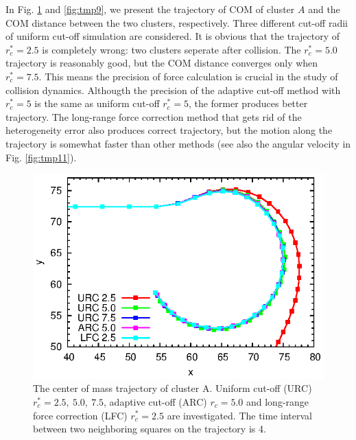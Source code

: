 \documentclass[aps,pre,preprint]{revtex4-1}
\begin{document}
In Fig. \ref{fig:tmp8} and \ref{fig:tmp9}, we present the trajectory
of COM of cluster $A$ and the COM distance between the two clusters,
respectively. Three different cut-off radii of uniform cut-off
simulation are considered. It is obvious that the trajectory of
$r_c^\ast = 2.5$ is completely wrong: two clusters seperate after
collision. The $r_c^\ast = 5.0$ trajectory is reasonably good, but the
COM distance converges only when $r_c^\ast = 7.5$. This means the
precision of force calculation is crucial in the study of collision
dynamics. Althougth the precision of the adaptive cut-off method with
$r_c^\ast = 5$ is the same as uniform cut-off $r_c^\ast = 5$, the former
produces better trajectory. The long-range force
correction method that gets rid of the heterogeneity error also produces
correct trajectory, but the motion along the trajectory is somewhat
faster than other methods (see also the angular velocity in
Fig. \ref{fig:tmp11}).

\begin{figure}
  \centering
  \includegraphics[]{fig/trajs.eps}
  \caption{The center of mass trajectory of cluster A. Uniform cut-off
    (URC) $r_c^\ast = 2.5,\ 5.0,\ 7.5$, adaptive cut-off (ARC) $r_c =
    5.0$ and long-range force correction (LFC) $r^\ast_c = 2.5$ are
    investigated.  The time interval between two neighboring squares
    on the trajectory is 4.  }
  \label{fig:tmp8}
\end{figure}
\end{document}
